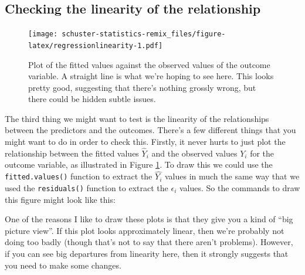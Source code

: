 \documentclass[
]{book}
\newenvironment{Shaded}{\begin{snugshade}}{\end{snugshade}}
\newcommand{\AttributeTok}[1]{\textcolor[rgb]{0.77,0.63,0.00}{#1}}
\newcommand{\FloatTok}[1]{\textcolor[rgb]{0.00,0.00,0.81}{#1}}
\newcommand{\FunctionTok}[1]{\textcolor[rgb]{0.00,0.00,0.00}{#1}}
\newcommand{\NormalTok}[1]{#1}
\newcommand{\OtherTok}[1]{\textcolor[rgb]{0.56,0.35,0.01}{#1}}
\newcommand{\SpecialCharTok}[1]{\textcolor[rgb]{0.00,0.00,0.00}{#1}}
\newcommand{\StringTok}[1]{\textcolor[rgb]{0.31,0.60,0.02}{#1}}
\begin{document}
\hypertarget{regressionlinearity}{%
\subsection{Checking the linearity of the relationship}\label{regressionlinearity}}

\begin{figure}
\centering
\texttt{[image: schuster-statistics-remix\_files/figure-latex/regressionlinearity-1.pdf]}
\caption{\label{fig:regressionlinearity}Plot of the fitted values against the observed values of the outcome variable. A straight line is what we're hoping to see here. This looks pretty good, suggesting that there's nothing grossly wrong, but there could be hidden subtle issues.}
\end{figure}

The third thing we might want to test is the linearity of the relationships between the predictors and the outcomes. There's a few different things that you might want to do in order to check this. Firstly, it never hurts to just plot the relationship between the fitted values \(\hat{Y}_i\) and the observed values \(Y_i\) for the outcome variable, as illustrated in Figure \ref{fig:regressionlinearity}. To draw this we could use the \texttt{fitted.values()} function to extract the \(\hat{Y_i}\) values in much the same way that we used the \texttt{residuals()} function to extract the \(\epsilon_i\) values. So the commands to draw this figure might look like this:

\begin{Shaded}
\end{Shaded}

One of the reasons I like to draw these plots is that they give you a kind of ``big picture view''. If this plot looks approximately linear, then we're probably not doing too badly (though that's not to say that there aren't problems). However, if you can see big departures from linearity here, then it strongly suggests that you need to make some changes.
\end{document}
